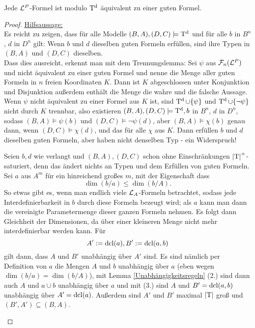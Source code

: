 \begin{theorem}\label{Formelreduzierung}
	Jede $\mathcal{L}^P$-Formel ist modulo $\operatorname{T^d}$ äquivalent zu einer guten Formel.	
\end{theorem}
\begin{proof}
	\underline{Hilfsaussage:}\\
	Es reicht zu zeigen, dass für alle Modelle $(B,A),(D,C)\models\operatorname{T^d}$ und für alle $b$ in $B^n$, $d$ in $D^n$ gilt: Wenn $b$ und $d$ dieselben guten Formeln erfüllen, sind ihre Typen in $(B,A)$ und $(D,C)$ dieselben.\\
	Dass dies ausreicht, erkennt man mit dem Trennungslemma:\linebreak
	Sei $\psi$ aus $\mathcal{F}_n(\mathcal{L}^P)$ und nicht äquivalent zu einer guten Formel und nenne die Menge aller guten Formeln in $n$ freien Koordinaten $K$. Dann ist $K$ abgeschlossen unter Konjunktion und Disjunktion außerdem enthält die Menge die wahre und die falsche Aussage. Wenn $\psi$ nicht äquivalent zu einer Formel aus $K$ ist, sind $\operatorname{T^d}\cup\{\psi\}$ und $\operatorname{T^d}\cup\{\neg\psi\}$ nicht durch $K$ trennbar, also existieren $(B,A),(D,C)\models\operatorname{T^d},b$ in $B^n$, $d$ in $D^n$, sodass $(B,A)\models\psi(b)$ und $(D,C)\models\neg\psi(d)$, aber $(B,A)\models\chi(b)$ genau dann, wenn $(D,C)\models\chi(d)$, und das für alle $\chi$ aus $K$. Dann erfüllen $b$ und $d$ dieselben guten Formeln, aber haben nicht denselben Typ - ein Widerspruch!
	\newpage
	\begin{proof2}
		Seien $b,d$ wie verlangt und $(B,A),(D,C)$ schon ohne Einschränkungen ${\left| \operatorname{T} \right|}^+$-saturiert, denn das ändert nichts an Typen und dem Erfüllen von guten Formeln. Sei $a$ aus $A^m$ für ein hinreichend großes $m$, mit der Eigenschaft dass $$\dim(b/a)\leq\dim(b/A).$$ So etwas gibt es, wenn man endlich viele $\mathcal{L}_A$-Formeln betrachtet, sodass jede Interdefinierbarkeit in $b$ durch diese Formeln bezeugt wird; als $a$ kann man dann die vereinigte Parametermenge dieser ganzen Formeln nehmen. Es folgt dann Gleichheit der Dimensionen, da über einer kleineren Menge nicht mehr interdefinierbar werden kann. Für $$A':=\operatorname{dcl}(a),B':=\operatorname{dcl}(a,b)$$ gilt dann, dass $A$ und $B'$ unabhängig über $A'$ sind. Es sind nämlich per Definition von $a$ die Mengen $A$ und $b$ unabhängig über $a$ (eben wegen $\dim(b/a)=\dim(b/A)$), mit Lemma \ref{Unabhängigkeitsregeln} (2.) sind dann auch $A$ und $a\cup b$ unabhängig über $a$ und mit (3.) sind $A$ und $B'=\operatorname{dcl}(a,b)$ unabhängig über $A'=\operatorname{dcl}(a)$. Außerdem sind $A'$ und $B'$ maximal ${\left| \operatorname{T} \right|}$ groß und $(B',A')\subseteq (B,A)$.\\

\end{proof2}
\end{proof}
